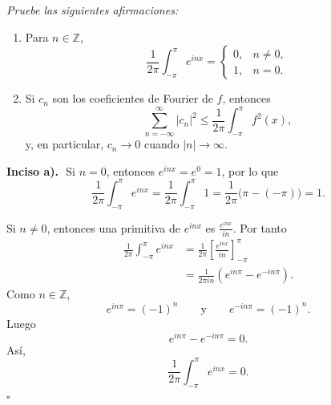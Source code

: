 \documentclass[11pt,letterpaper]{article}
\newcommand{\Z}{\mathbb{Z}}
\begin{document}
\begin{tcolorbox}[title=\textcolor{white}{Problema 3}]
\textit{Pruebe las siguientes afirmaciones:}
\begin{enumerate}
    \item[\textbf{a)}] Para $n\in\Z$,
    \begin{equation*}
        \frac{1}{2\pi}\int_{-\pi}^{\pi} e^{inx}=
        \begin{cases}
        0, & n\neq 0,\\
        1, & n=0.
        \end{cases}
    \end{equation*}
    \item[\textbf{c)}] Si $c_n$ son los coeficientes de Fourier de $f$, entonces
    \begin{equation*}
        \sum_{n=-\infty}^{\infty}|c_n|^2\leq \frac{1}{2\pi}\int_{-\pi}^{\pi} f^2(x),
    \end{equation*}
    y, en particular, $c_n\to 0$ cuando $|n|\to\infty$.
\end{enumerate}
\end{tcolorbox}

\textbf{Inciso a).}\,\
Si $n=0$, entonces $e^{inx}=e^0=1$, por lo que
\begin{equation*}
    \frac{1}{2\pi}\int_{-\pi}^{\pi} e^{inx}
    =\frac{1}{2\pi}\int_{-\pi}^{\pi}1
    =\frac{1}{2\pi}\bigl(\pi-(-\pi)\bigr)=1.
\end{equation*}

Si $n\neq0$, entonces una primitiva de $e^{inx}$ es $\frac{e^{inx}}{in}$. Por tanto
\begin{align*}
    \frac{1}{2\pi}\int_{-\pi}^{\pi} e^{inx}
    &=\frac{1}{2\pi}\left[\frac{e^{inx}}{in}\right]_{-\pi}^{\pi} \\
    &=\frac{1}{2\pi in}\left(e^{in\pi}-e^{-in\pi}\right).
\end{align*}
Como $n\in\Z$,
\begin{equation*}
    e^{in\pi}=(-1)^n
    \qquad \text{y}\qquad
    e^{-in\pi}=(-1)^n.
\end{equation*}
Luego
\begin{equation*}
    e^{in\pi}-e^{-in\pi}=0.
\end{equation*}
Así,
\begin{equation*}
    \frac{1}{2\pi}\int_{-\pi}^{\pi} e^{inx}=0.
\end{equation*}
\hfill $\square$

\vspace{0.4cm}
\end{document}
